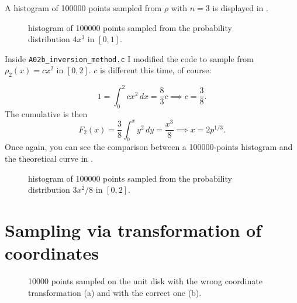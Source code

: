 \documentclass{gulartcl}
\begin{document}


A histogram of \num{100000} points sampled from $\rho$ with $n = 3$ is displayed
in .

\begin{figure}
    \centering
    
    \caption{histogram of \num{100000} points sampled from the probability
        distribution $4 x^3$ in $[0, 1]$.}
    \label{fig:A02a_3}
\end{figure}

Inside \texttt{A02b\_inversion\_method.c} I modified the code to sample from
$\rho_2(x) = cx^2$ in $[0, 2]$. $c$ is different this time, of course:

\begin{equation}
    1 = \int_{0}^{2} cx^2 \, dx = \frac{8}{3}c \implies c = \frac{3}{8}.
\end{equation}
The cumulative is then
\begin{equation}
    F_2(x) = \frac{3}{8} \int_{0}^{x} y^2 \, dy = \frac{x^3}{8} \implies x = 2
    p^{1/3}.
\end{equation}
Once again, you can see the comparison between a \num{100000}-points histogram
and the theoretical curve in .

\begin{figure}
    \centering
    
    \caption{histogram of \num{100000} points sampled from the probability
        distribution $3x^2/8$ in $[0, 2]$.}
    \label{fig:A02b}
\end{figure}

\section{Sampling via transformation of coordinates}

\begin{figure}
    \centering
    \begin{minipage}[t]{0.5\linewidth}
        \centering
        
        \subcaption{}
        \label{subfig:A03aa}
    \end{minipage}\hfill%
    \begin{minipage}[t]{0.5\linewidth} 
        \centering
            
        \subcaption{}
        \label{subfig:A03ab}
    \end{minipage}
    \caption{\num{10000} points sampled on the unit disk with the wrong
        coordinate transformation (a) and with the correct one (b).}
    \label{fig:A03a}
\end{figure}
\end{document}

